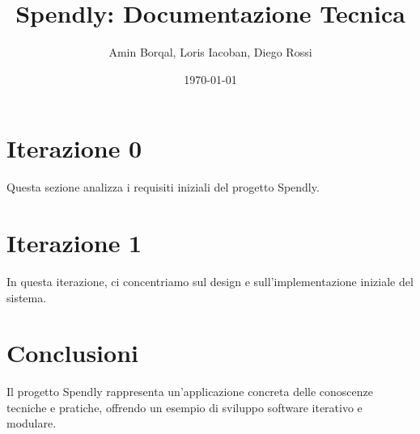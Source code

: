 \documentclass{softwaredoc}
\title{Spendly: Documentazione Tecnica}
\author{Amin Borqal, Loris Iacoban, Diego Rossi}
\date{\today}
\begin{document}
\maketitle

\tableofcontents
\listoffigures
\listoftables
\newpage

\section*{Iterazione 0}
Questa sezione analizza i requisiti iniziali del progetto Spendly.





\newpage



\newpage
\section*{Iterazione 1}
In questa iterazione, ci concentriamo sul design e sull'implementazione iniziale del sistema.
\section*{Conclusioni}
Il progetto Spendly rappresenta un'applicazione concreta delle conoscenze tecniche e pratiche, offrendo un esempio di sviluppo software iterativo e modulare.
\end{document}
